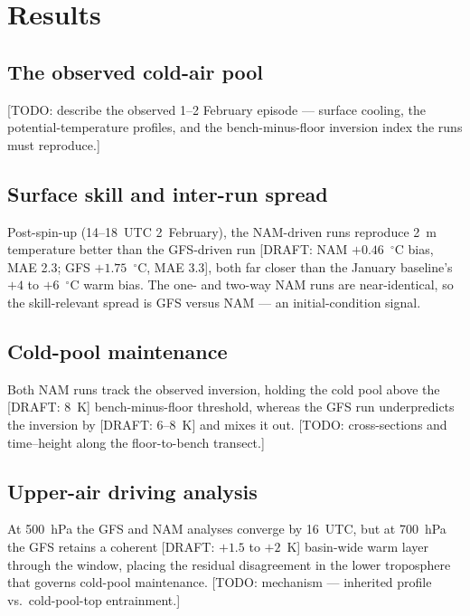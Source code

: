 \documentclass[air,article,submit,pdftex,moreauthors]{Definitions/mdpi}
\begin{document}
\section{Results}

\subsection{The observed cold-air pool}
[TODO: describe the observed 1--2 February episode --- surface cooling, the
potential-temperature profiles, and the bench-minus-floor inversion index the
runs must reproduce.]

\subsection{Surface skill and inter-run spread}
Post-spin-up (14--18~UTC 2~February), the NAM-driven runs reproduce 2~m
temperature better than the GFS-driven run
[DRAFT: NAM $+0.46$~$^{\circ}$C bias, MAE 2.3; GFS $+1.75$~$^{\circ}$C, MAE 3.3],
both far closer than the January baseline's $+4$ to $+6$~$^{\circ}$C warm bias.
The one- and two-way NAM runs are near-identical, so the skill-relevant spread
is GFS versus NAM --- an initial-condition signal.

\subsection{Cold-pool maintenance}
Both NAM runs track the observed inversion, holding the cold pool above the
[DRAFT: 8~K] bench-minus-floor threshold, whereas the GFS run underpredicts the
inversion by [DRAFT: 6--8~K] and mixes it out.
[TODO: cross-sections and time--height along the floor-to-bench transect.]

\subsection{Upper-air driving analysis}
At 500~hPa the GFS and NAM analyses converge by 16~UTC, but at 700~hPa the GFS
retains a coherent [DRAFT: $+1.5$ to $+2$~K] basin-wide warm layer through the
window, placing the residual disagreement in the lower troposphere that governs
cold-pool maintenance.
[TODO: mechanism --- inherited profile vs.\ cold-pool-top entrainment.]
\end{document}

